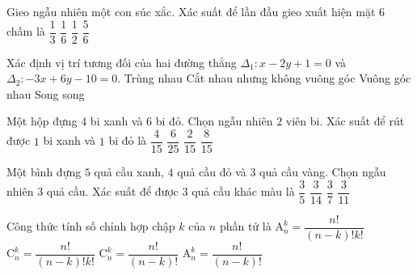 \begin{ex}%
	Gieo ngẫu nhiên một con súc xắc. Xác suất để lần đầu gieo xuất hiện mặt $6$ chấm là
	\choice
	{$\dfrac{1}{3}$}
	{\True $\dfrac{1}{6}$}
	{$\dfrac{1}{2}$}
	{$\dfrac{5}{6}$}
\end{ex}

\begin{ex}%
	Xác định vị trí tương đối của hai đường thẳng $\Delta_1\colon x-2y+1=0$ và $\Delta_2\colon -3x + 6y -10=0$.
	\choice
	{Trùng nhau}
	{Cắt nhau nhưng không vuông góc}
	{Vuông góc nhau}
	{\True Song song}
\end{ex}

\begin{ex}%
	Một hộp đựng $4$ bi xanh và $6$ bi đỏ. Chọn ngẫu nhiên $2$ viên bi. Xác suất để rút được $1$ bi xanh và $1$ bi đỏ là
	\choice
	{$\dfrac{4}{15}$}
	{$\dfrac{6}{25}$}
	{$\dfrac{2}{15}$}
	{\True $\dfrac{8}{15}$}
\end{ex}

\begin{ex}%
	Một bình đựng $5$ quả cầu xanh, $4$ quả cầu đỏ và $3$ quả cầu vàng. Chọn ngẫu nhiên $3$ quả cầu. Xác suất để được $3$ quả cầu khác màu là
	\choice
	{$\dfrac{3}{5}$}
	{$\dfrac{3}{14}$}
	{$\dfrac{3}{7}$}
	{\True $\dfrac{3}{11}$}
\end{ex}

\begin{ex}%
	Công thức tính số chỉnh hợp chập $k$ của $n$ phần tử là
	\choice
	{$\mathrm{A}^k_n = \dfrac{n!}{(n-k)!k!}$}
	{$\mathrm{C}^k_n = \dfrac{n!}{(n-k)!k!}$}
	{$\mathrm{C}^k_n = \dfrac{n!}{(n-k)!}$}
	{\True $\mathrm{A}^k_n = \dfrac{n!}{(n-k)!}$}
\end{ex}

